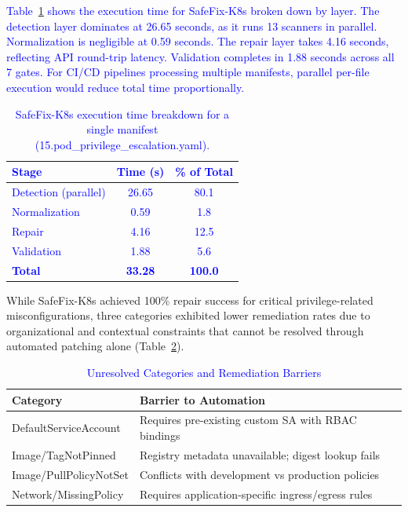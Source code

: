 \documentclass[preprint,12pt]{elsarticle}
\newcommand{\new}[1]{\textcolor{blue}{#1}}
\newcommand{\safefixtablestyle}{%
  \small
  \setlength{\tabcolsep}{5pt}
  \renewcommand{\arraystretch}{1.15}
}
\begin{document}
\new{
Table~\ref{tab:safefix-timing} shows the execution time for 
SafeFix-K8s broken down by layer. The detection layer dominates at 26.65 
seconds, as it runs 13 scanners in parallel. Normalization is negligible 
at 0.59 seconds. The repair layer takes 4.16 seconds, reflecting 
API round-trip latency. Validation completes in 1.88 seconds across all 
7 gates. For CI/CD pipelines processing multiple manifests, parallel 
per-file execution would reduce total time proportionally. }

\new{
\begin{table}[htbp]
\centering
\caption{SafeFix-K8s execution time breakdown for a single manifest (15.pod\_privilege\_escalation.yaml).}
\label{tab:safefix-timing}
\safefixtablestyle
\begin{tabular}{@{} l c c @{}}
\toprule
\textbf{Stage} & \textbf{Time (s)} & \textbf{\% of Total} \\
\midrule
Detection (parallel) & 26.65 & 80.1 \\
Normalization                  &  0.59 &  1.8 \\
Repair                    &  4.16 & 12.5 \\
Validation                     &  1.88 &  5.6 \\
\midrule
\textbf{Total}                 & \textbf{33.28} & \textbf{100.0} \\
\bottomrule
\end{tabular}
\end{table}
}


While SafeFix-K8s achieved 100\% repair success for critical privilege-related 
misconfigurations, three categories exhibited lower remediation rates due to 
organizational and contextual constraints that cannot be resolved through 
automated patching alone (Table~\ref{tab:unresolved_categories}).

\begin{table}[htbp]
\centering
\caption{\new{Unresolved Categories and Remediation Barriers}}
\label{tab:unresolved_categories}
\small
\begin{tabular}{@{}lp{6.5cm}@{}}
\toprule
\textbf{Category}  & \textbf{Barrier to Automation} \\
\midrule
DefaultServiceAccount  & Requires pre-existing custom SA with RBAC bindings \\
Image/TagNotPinned  & Registry metadata unavailable; digest lookup fails \\
Image/PullPolicyNotSet  & Conflicts with development vs production policies \\
Network/MissingPolicy  & Requires application-specific ingress/egress rules \\
\bottomrule
\end{tabular}
\end{table}
\end{document}
